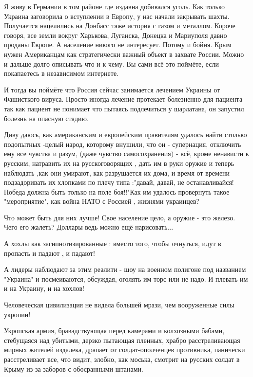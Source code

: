 Я живу в Германии в том районе где издавна добивался уголь. Как только Украина
заговорила о вступлении в Европу, у нас начали закрывать шахты. Получается
нацелились на Донбасс таже история с газом и металлом. Короче говоря, все земли
вокруг Харькова, Луганска, Донецка и Мариуполя давно проданы Европе. А
население никого не интересует. Потому и бойня. Крым нужен Американцам как
стратегически важный объект в захвате России. Можно и дальше долго описывать
что и к чему. Вы сами всё это поймёте, если покапаетесь в независимом
интернете.

И тогда вы поймёте что Россия сейчас занимается лечением Украины от Фашисткого
вируса. Просто иногда лечение протекает болезненно для пациента так как пациент
не понимает что пытаясь подлечиться у шарлатана, он запустил болезнь на опасную
стадию.


Диву даюсь, как американским и европейским правителям удалось найти столько
подопытных -целый народ, которому внушили, что он - супернация, отключить ему
все чувства и разум, (даже чувство самосохранения) - всё, кроме ненависти к
русским, натравить их на русскоговорящих , дать им в руки оружие и теперь
наблюдать ,как они умирают, как разрушается их дома, и время от времени
подзадоривать их хлопками по плечу типа :"давай, давай, не останавливайся!
Победа должна быть только на поле боя!!"Как им удалось провернуть такое
"мероприятие", как война НАТО с Россией , жизнями украинцев?

Что может быть для них лучше! Свое население цело, а оружие - это железо. Чего
его жалеть? Доллары ведь можно ещё нарисовать...

А хохлы как загипнотизированные : вместо того, чтобы очнуться, идут в пропасть
и падают , и падают!

А лидеры наблюдают за этим реалити - шоу на военном полигоне под названием
"Украина" и посмеиваются, обсуждая, оголять им торс или не надо. И плевать им и
на Украину, и на хохлов!


Человеческая цивилизация не видела большей мрази, чем вооруженные силы укропии!

Укропская армия, бравадствующая перед камерами и колхозными бабами, стебущаяся
над убитыми, дерзко пытающая пленных, храбро расстреливающая мирных жителей
издалека, драпает от солдат-ополченцев противника, панически расстреливает все,
что видит, злобно, как моська, смотрит на русских солдат в Крыму из-за заборов
с обосранными штанами.

